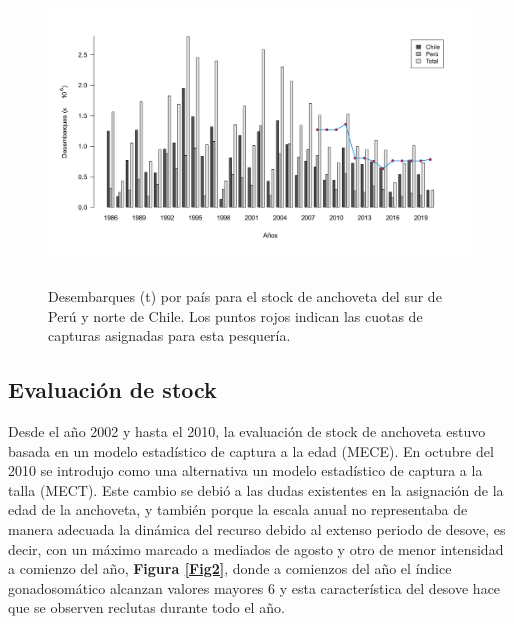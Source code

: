 \documentclass[letter,11pt]{article}
\begin{document}
\vspace{0.5cm}
\begin{figure}[htb!]
 \centering
 \includegraphics[width=13cm,height=8cm]{Figuras/figura6.pdf}
 \caption{Desembarques (t) por pa\'is para el stock de anchoveta del sur de Per\'u y norte de Chile. Los puntos rojos indican las cuotas de capturas asignadas para esta pesquer\'ia.}
 \label{Fig6}
\end{figure}


\subsection{Evaluaci\'on de stock}

Desde el a\~{n}o 2002 y hasta el 2010, la evaluaci\'on de stock de anchoveta
estuvo basada en un modelo estad\'istico de captura a la edad (MECE). En
octubre del 2010 se introdujo como una alternativa un modelo estad\'istico
de captura a la talla (MECT). Este cambio se debi\'o a las dudas
existentes en la asignaci\'on de la edad de la anchoveta, y tambi\'en porque
la escala anual no representaba de manera adecuada la din\'amica del
recurso debido al extenso periodo de desove, es decir, con un m\'aximo
marcado a mediados de agosto y otro de menor intensidad a comienzo del
a\~{n}o, \textbf{Figura \ref{Fig2}}, donde a comienzos del a\~{n}o el \'indice
gonadosom\'atico alcanzan valores mayores 6 y esta caracter\'istica del
desove hace que se observen reclutas durante todo el a\~{n}o.
\end{document}
